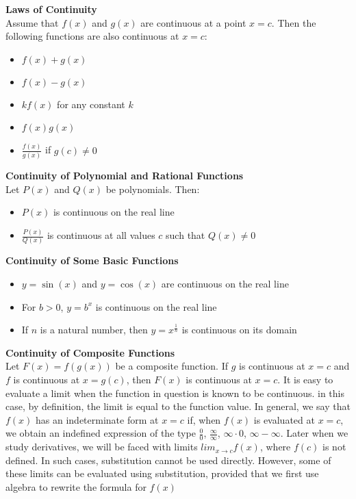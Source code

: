 \documentclass{article}
\begin{document}
	\textbf{Laws of Continuity}\\
	Assume that $f(x)$ and $g(x)$ are continuous at a point $x = c$. Then the following functions are also continuous at $x = c$:\\
		\begin{itemize}
			\item $f(x) + g(x)$
			\item $f(x) - g(x)$
			\item $kf(x)$ for any constant $k$
			\item $f(x)g(x)$
			\item $\frac{f(x)}{g(x)}$ if $g(c) \neq 0$
		\end{itemize}

	\textbf{Continuity of Polynomial and Rational Functions}\\
	Let $P(x)$ and $Q(x)$ be polynomials. Then:\\
		\begin{itemize}
			\item $P(x)$ is continuous on the real line
			\item $\frac{P(x)}{Q(x)}$ is continuous at all values $c$ such that $Q(x) \neq 0$
		\end{itemize}

	\textbf{Continuity of Some Basic Functions}\\
		\begin{itemize}
			\item $y = \sin(x)$ and $y = \cos(x)$ are continuous on the real line
			\item For $b > 0$, $y = b^x$ is continuous on the real line
			\item If $n$ is a natural number, then $y = x^{\frac{1}{n}}$ is continuous on its domain
		\end{itemize}

	\textbf{Continuity of Composite Functions}\\
		Let $F(x) = f(g(x))$ be a composite function. If $g$ is continuous at $x = c$ and $f$ is continuous at $x = g(c)$, then $F(x)$ is continuous at $x = c$. It is easy to evaluate a limit when the function in question is known to be continuous. in this case, by definition, the limit is equal to the function value. In general, we say that $f(x)$ has an indeterminate form at $x = c$ if, when $f(x)$ is evaluated at $x = c$, we obtain an indefined expression of the type $\frac{0}{0}$, $\frac{\infty}{\infty}$, $\infty \cdot 0$, $\infty - \infty$. Later when we study derivatives, we will be faced with limits $lim_{x \to c}f(x)$, where $f(c)$ is not defined. In such cases, substitution cannot be used directly. However, some of these limits can be evaluated using substitution, provided that we first use algebra to rewrite the formula for $f(x)$\\
\end{document}
